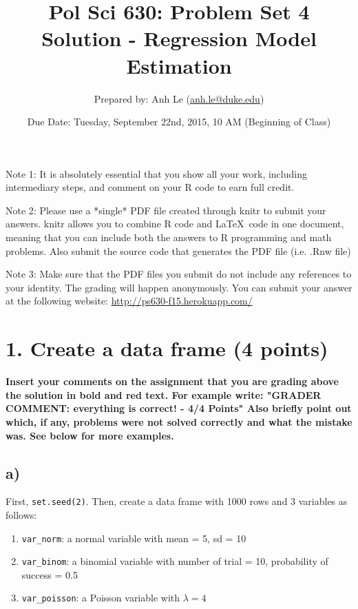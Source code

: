 \documentclass{article}\usepackage[]{graphicx}\usepackage[]{color}
\begin{document}
\title{Pol Sci 630: Problem Set 4 Solution - Regression Model Estimation}

\author{Prepared by: Anh Le (\href{mailto:anh.le@duke.edu}{anh.le@duke.edu})}

\date{Due Date: Tuesday, September 22nd, 2015, 10 AM (Beginning of Class)}

\maketitle

Note 1: It is absolutely essential that you show all your work, including intermediary steps, and comment on your R code to earn full credit.

Note 2: Please use a *single* PDF file created through knitr to submit your answers. knitr allows you to combine R code and \LaTeX \ code in one document, meaning that you can include both the answers to R programming and math problems. Also submit the source code that generates the PDF file (i.e. .Rnw file)

Note 3: Make sure that the PDF files you submit do not include any references to your identity. The grading will happen anonymously. You can submit your answer at the following website: \url{http://ps630-f15.herokuapp.com/}

\section*{1. Create a data frame (4 points)}

\textbf{\color{red} Insert your comments on the assignment that you are grading above the solution in bold and red text. For example write: "GRADER COMMENT: everything is correct! - 4/4 Points" Also briefly point out which, if any, problems were not solved correctly and what the mistake was. See below for more examples.}

\subsection*{a)}
First, \verb`set.seed(2)`. Then, create a data frame with 1000 rows and 3 variables as follows:
\begin{enumerate}
\item \verb`var_norm`: a normal variable with mean = 5, sd = 10
\item \verb`var_binom`: a binomial variable with number of trial = 10, probability of success = 0.5
\item \verb`var_poisson`: a Poisson variable with $\lambda = 4$
\end{enumerate}
\end{document}
